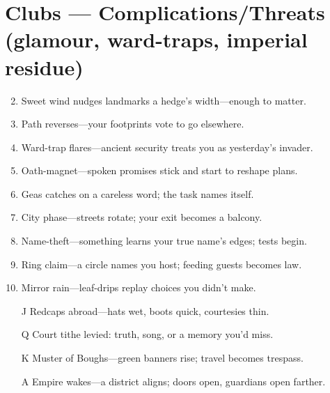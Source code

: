 \section*{Clubs --- Complications/Threats (glamour, ward-traps, imperial residue)}
\label{sec:valewood-complications}
\begin{enumerate}
\setcounter{enumi}{1}
\item Sweet wind nudges landmarks a hedge's width---enough to matter.
\item Path reverses---your footprints vote to go elsewhere.
\item Ward-trap flares---ancient security treats you as yesterday's invader.
\item Oath-magnet---spoken promises stick and start to reshape plans.
\item Geas catches on a careless word; the task names itself.
\item City phase---streets rotate; your exit becomes a balcony.
\item Name-theft---something learns your true name's edges; tests begin.
\item Ring claim---a circle names you host; feeding guests becomes law.
\item Mirror rain---leaf-drips replay choices you didn't make.
\item[J] Redcaps abroad---hats wet, boots quick, courtesies thin.
\item[Q] Court tithe levied: truth, song, or a memory you'd miss.
\item[K] Muster of Boughs---green banners rise; travel becomes trespass.
\item[A] Empire wakes---a district aligns; doors open, guardians open farther.
\end{enumerate}

